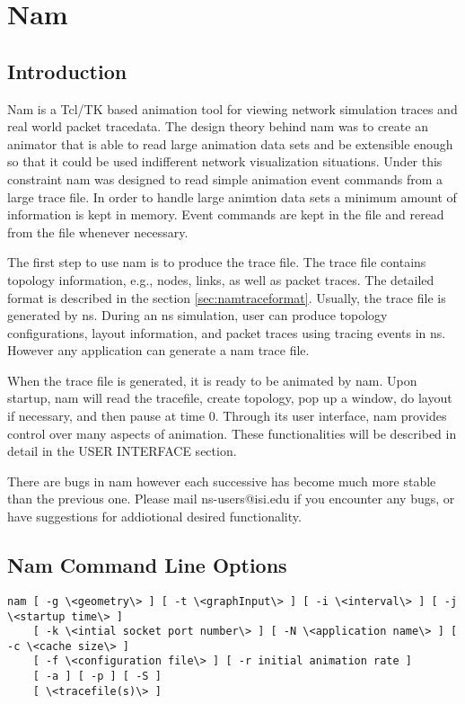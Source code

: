 
\chapter{Nam}
\label{chap:nam}


\section{Introduction}

Nam is a Tcl/TK based animation tool for viewing network simulation traces and real world packet tracedata. The design theory behind nam was to create an animator that is able to read large animation data sets and be extensible enough so that it could be used indifferent network visualization situations.  Under this constraint nam was designed to read simple animation event commands from a large trace file.  In order to handle large animtion data sets a minimum amount of information is kept in memory.  Event commands are kept in the file and reread from the file whenever necessary.

The first step to use nam is to produce the trace file. The trace file contains topology information, e.g., nodes, links, as well as packet traces. The detailed format is described in the section \ref{sec:namtraceformat}. Usually, the trace file is generated by ns. During an ns simulation, user can produce topology configurations, layout information, and packet traces using tracing events in ns.  However any application can generate a nam trace file.

When the trace file is generated, it is ready to be animated by nam. Upon startup, nam will read the tracefile, create topology, pop up a window, do layout if necessary, and then pause at time 0. Through its user interface, nam provides control over many aspects of animation. These functionalities will be described in detail in the USER INTERFACE section.

There are bugs in nam however each successive has become much more stable than the previous one.  Please  mail ns-users@isi.edu if you encounter any bugs, or have suggestions for addiotional desired functionality.

\section{Nam Command Line Options}
\label{sec:namcommandlineoptions}
\begin{verbatim}
nam [ -g \<geometry\> ] [ -t \<graphInput\> ] [ -i \<interval\> ] [ -j \<startup time\> ] 
    [ -k \<intial socket port number\> ] [ -N \<application name\> ] [ -c \<cache size\> ] 
    [ -f \<configuration file\> ] [ -r initial animation rate ]
    [ -a ] [ -p ] [ -S ]
    [ \<tracefile(s)\> ]
\end{verbatim}

